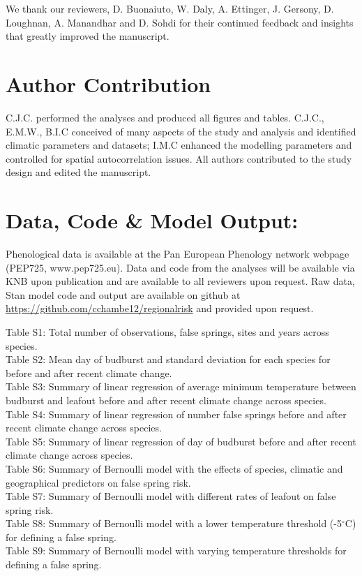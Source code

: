 \documentclass{article}\usepackage[]{graphicx}\usepackage[]{color}
\begin{document}
We thank our reviewers, D. Buonaiuto, W. Daly, A. Ettinger, J. Gersony, D. Loughnan, A. Manandhar and D. Sohdi for their continued feedback and insights that greatly improved the manuscript.

\section*{Author Contribution}
C.J.C. performed the analyses and produced all figures and tables. C.J.C., E.M.W., B.I.C conceived of many aspects of the study and analysis and identified climatic parameters and datasets; I.M.C enhanced the modelling parameters and controlled for spatial autocorrelation issues. All authors contributed to the study design and edited the manuscript.

\section*{Data, Code \& Model Output:}
Phenological data is available at the Pan European Phenology network webpage (PEP725, www.pep725.eu). Data and code from the analyses will be available via KNB upon publication and are available to all reviewers upon request. Raw data, {Stan} model code and output are available on github at \url{https://github.com/cchambe12/regionalrisk} and provided upon request.



\newpage
Table S1: Total number of observations, false springs, sites and years across species. \\
Table S2:  Mean day of budburst and standard deviation for each species for before and after recent climate change. \\
Table S3: Summary of linear regression of average minimum temperature between budburst and leafout before and after recent climate change across species. \\
Table S4: Summary of linear regression of number false springs before and after recent climate change across species. \\
Table S5: Summary of linear regression of day of budburst before and after recent climate change across species. \\
Table S6: Summary of Bernoulli model with the effects of species, climatic and geographical predictors on false spring risk. \\
Table S7: Summary of Bernoulli model with different rates of leafout on false spring risk. \\
Table S8: Summary of Bernoulli model with a lower temperature threshold (-5$^{\circ}$C) for defining a false spring. \\
Table S9: Summary of Bernoulli model with varying temperature thresholds for defining a false spring. \\
\end{document}
